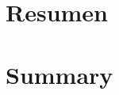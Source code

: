 \documentclass[11pt, oneside]{book}
\begin{document}



\chapter*{Resumen}

\pagestyle{plain}

\noindent 


\chapter*{Summary}


\pagestyle{plain}

\noindent 


\tableofcontents


\listoftables

\listoffigures


\mainmatter %

\pagestyle{plain}



\end{document}
